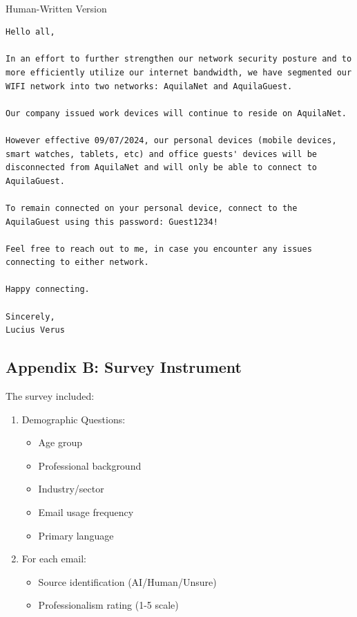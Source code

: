 \documentclass[
]{article}
\makeatletter
\let\oldparagraph\paragraph
\renewcommand{\paragraph}{
    \@ifstar
      \xxxParagraphStar
      \xxxParagraphNoStar
  }
\newcommand{\xxxParagraphStar}[1]{\oldparagraph*{#1}\mbox{}}
\newcommand{\xxxParagraphNoStar}[1]{\oldparagraph{#1}\mbox{}}
\providecommand{\tightlist}{%
  \setlength{\itemsep}{0pt}\setlength{\parskip}{0pt}}\usepackage{longtable,booktabs,array}
\makeatother
\begin{document}
\paragraph{Human-Written Version}\label{human-written-version-3}

\begin{verbatim}
Hello all,

In an effort to further strengthen our network security posture and to more efficiently utilize our internet bandwidth, we have segmented our WIFI network into two networks: AquilaNet and AquilaGuest.

Our company issued work devices will continue to reside on AquilaNet.

However effective 09/07/2024, our personal devices (mobile devices, smart watches, tablets, etc) and office guests' devices will be disconnected from AquilaNet and will only be able to connect to AquilaGuest.

To remain connected on your personal device, connect to the AquilaGuest using this password: Guest1234!

Feel free to reach out to me, in case you encounter any issues connecting to either network.

Happy connecting.

Sincerely,
Lucius Verus
\end{verbatim}

\subsection{Appendix B: Survey
Instrument}\label{appendix-b-survey-instrument}

The survey included:

\begin{enumerate}
\def\labelenumi{\arabic{enumi}.}
\tightlist
\item
  Demographic Questions:

  \begin{itemize}
  \tightlist
  \item
    Age group
  \item
    Professional background
  \item
    Industry/sector
  \item
    Email usage frequency
  \item
    Primary language
  \end{itemize}
\item
  For each email:

  \begin{itemize}
  \tightlist
  \item
    Source identification (AI/Human/Unsure)
  \item
    Professionalism rating (1-5 scale)
  \end{itemize}
\end{enumerate}
\end{document}
